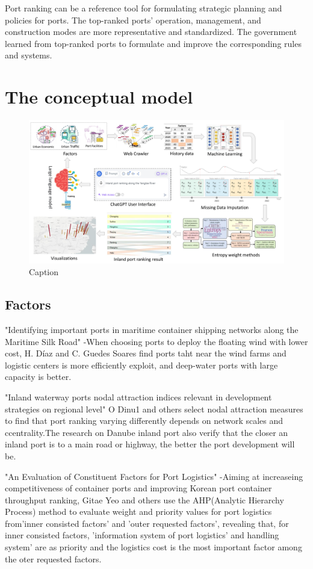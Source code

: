 \documentclass[preprint]{elsarticle}
\begin{document}
Port ranking can be a reference tool for formulating strategic planning and policies for ports. The top-ranked ports' operation, management, and construction modes are more representative and standardized. The government learned from top-ranked ports to formulate and improve the corresponding rules and systems.

\section{The conceptual model}
\begin{figure}[H]
    \centering
    \includegraphics[width=1.0\textwidth]{pic/autoportranking.pdf}
    \caption{Caption}
    \label{fig:enter-label}
\end{figure}
\subsection{Factors}
"Identifying important ports in maritime container shipping networks along the Maritime Silk Road" -When choosing ports to deploy the floating wind with lower cost, H. Díaz  and C. Guedes Soares find ports taht near the wind farms and logistic centers is more efficiently exploit, and deep-water ports with large capacity is better.

"Inland waterway ports nodal attraction indices relevant in development strategies on regional level"
O Dinu1 and others select nodal attraction measures to  find that port ranking varying differently depends on network scales and ccentrality.The research on Danube inland   port also verify that the closer an inland port is to a main road or highway, the better the port development will be.

"An Evaluation of Constituent Factors for Port Logistics" -Aiming at increaseing competitiveness of container ports and improving Korean port container throughput ranking, Gitae Yeo and others use the AHP(Analytic Hierarchy Process) method to evaluate weight and priority values for port logistics from'inner consisted factors' and 'outer requested factors', revealing that, for inner consisted factors, 'information system of port logistics' and handling system' are as priority and the logistics cost is the most important factor among the oter requested factors.
\end{document}
